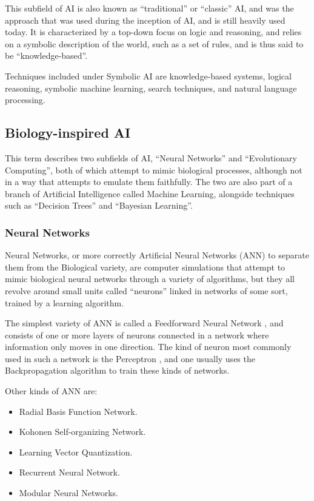 \documentclass[]{report}
\begin{document}
This subfield of AI is also known as ``traditional'' or ``classic'' AI, and was
the approach that was used during the inception of AI, and is still heavily used
today. It is characterized by a top-down focus on logic and reasoning, and
relies on a symbolic description of the world, such as a set of rules, and is
thus said to be ``knowledge-based''.

Techniques included under Symbolic AI are knowledge-based systems, logical
reasoning, symbolic machine learning, search techniques, and natural language
processing.

\subsection{Biology-inspired AI}
\label{sec:biology-inspired-ai}

This term describes two subfields of AI, ``Neural Networks'' and ``Evolutionary
Computing'', both of which attempt to mimic biological processes, although not
in a way that attempts to emulate them faithfully. The two are also part of a
branch of Artificial Intelligence called Machine Learning, alongside techniques
such as ``Decision Trees'' and ``Bayesian Learning''.

\subsubsection{Neural Networks}
\label{sec:neural-networks}

Neural Networks, or more correctly Artificial Neural Networks (ANN) to separate
them from the Biological variety, are computer simulations that attempt to mimic
biological neural networks through a variety of algorithms, but they all revolve
around small units called ``neurons'' linked in networks of some sort, trained
by a learning algorithm.

The simplest variety of ANN is called a Feedforward Neural Network
\citep{wikipediafeedforward}, and consists of one or more layers of neurons
connected in a network where information only moves in one direction. The kind
of neuron most commonly used in such a network is the Perceptron
\citep{minsky1969perceptrons}, and one usually uses the Backpropagation
\citep{wikipediabackpropagation} algorithm to train these kinds of networks.

Other kinds of ANN are:
\begin{itemize}
\item Radial Basis Function Network.
\item Kohonen Self-organizing Network.
\item Learning Vector Quantization.
\item Recurrent Neural Network.
\item Modular Neural Networks.
\end{itemize}
\end{document}
